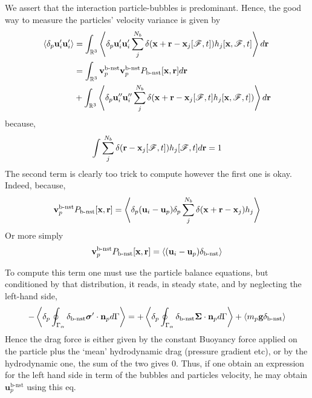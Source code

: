 \documentclass[12pt]{My_preprint}
\begin{document}
We assert that the interaction particle-bubbles is predominant.
Hence, the good way to measure the particles' velocity variance is given by 
\begin{align}
    \left<\delta_{p} \textbf{u}_i'\textbf{u}_i'\right>
    &=
    \int_{\mathbb{R}^3}
    \left<\delta_{p} \textbf{u}_i'\textbf{u}_i' \sum_j^{N_b} \delta(\textbf{x} + \textbf{r} - \textbf{x}_j[\mathscr{F},t])h_j[\textbf{x},\mathscr{F},t]\right>
    d \textbf{r}\\
    &=
    \int_{\mathbb{R}^3}
    \textbf{v}_p^\text{b-nst}
    \textbf{v}_p^\text{b-nst}
    P_\text{b-nst}[\textbf{x},\textbf{r}]
    d \textbf{r}\\
    &+
    \int_{\mathbb{R}^3}
    \left<\delta_{p} \textbf{u}_i''\textbf{u}_i'' \sum_j^{N_b} \delta(\textbf{x} + \textbf{r} - \textbf{x}_j[\mathscr{F},t]h_j[\textbf{x},\mathscr{F},t])\right>
    d \textbf{r}
\end{align}
because,
\begin{equation}
    \int \sum_j^{N_b} \delta(\textbf{r} - \textbf{x}_j[\mathscr{F},t])h_j[\mathscr{F},t] d\textbf{r} = 1
\end{equation}
The second term is clearly too trick to compute however the first one is okay. 
Indeed, because, 
\begin{equation}
    \textbf{v}_p^\text{b-nst}
    P_\text{b-nst}[\textbf{x},\textbf{r}]
    =
    \left<\delta_{p} (\textbf{u}_i - \textbf{u}_p) \delta_p\sum_j^{N_b} \delta(\textbf{x} + \textbf{r} - \textbf{x}_j)h_j\right>
\end{equation}
Or more simply
\begin{equation}
    \textbf{v}_p^\text{b-nst}
    P_\text{b-nst}[\textbf{x},\textbf{r}]
    =
    \left<(\textbf{u}_i - \textbf{u}_p)\delta_\text{b-nst}\right>
\end{equation}


To compute this term one must use the particle balance equations, but conditioned by that distribution, it  reads, in steady state, and by neglecting the left-hand side, 
\begin{equation}
    - \left<\delta_{p} \oint_{\Gamma_{\alpha}} \delta_\text{b-nst}\bm\sigma' \cdot \textbf{n}_p d\Gamma\right>
    = 
    + \left<\delta_{p} \oint_{\Gamma_{\alpha}} \delta_\text{b-nst}\bm\Sigma \cdot \textbf{n}_p d\Gamma\right>
    + \left<m_p \textbf{g} \delta_\text{b-nst}\right>
\end{equation}
Hence the drag force is either given by the constant Buoyancy force applied on the particle plus the `mean' hydrodynamic drag (pressure gradient etc), or by the hydrodynamic one, the sum of the two gives 0. 
Thus, if one obtain an expression for the left hand side in term of the bubbles and particles velocity, he may obtain $\textbf{u}_{p}^\text{b-nst}$ using this eq. 
\end{document}
